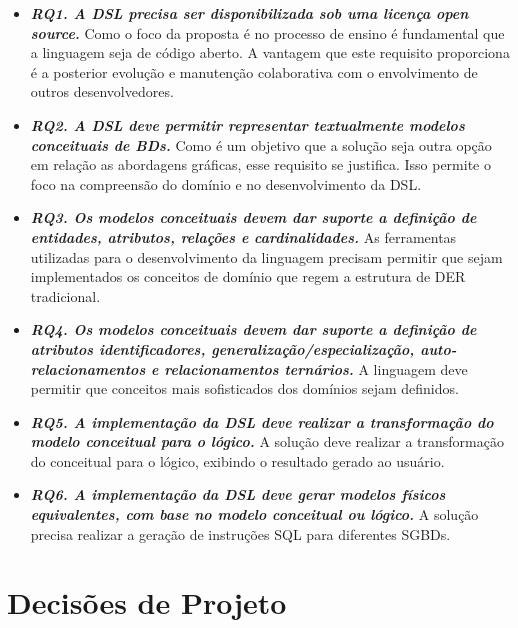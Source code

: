 \begin{itemize}

\item\textit{\textbf{RQ1. A \ac{DSL} precisa ser disponibilizada sob uma licença open source.}} 
Como o foco da proposta é no processo de ensino é fundamental que a linguagem seja de código aberto. 
A vantagem que este requisito proporciona é a posterior evolução e manutenção colaborativa com o envolvimento de outros desenvolvedores.

\item\textit{\textbf{RQ2. A \ac{DSL} deve permitir representar textualmente modelos conceituais de \acp{BD}.}} 
Como é um objetivo que a solução seja outra opção em relação as abordagens gráficas, esse requisito se justifica. 
Isso permite o foco na compreensão do domínio e no desenvolvimento da \ac{DSL}.

\item\textit{\textbf{RQ3. Os modelos conceituais devem dar suporte a definição de entidades, atributos, relações e cardinalidades.}} 
As ferramentas utilizadas para o desenvolvimento da linguagem precisam permitir que sejam implementados os conceitos de domínio que regem a estrutura de \ac{DER} tradicional.

\item\textit{\textbf{RQ4. Os modelos conceituais devem dar suporte a definição de atributos identificadores, generalização/especialização, auto-relacionamentos e relacionamentos ternários.}} 
A linguagem deve permitir que conceitos mais sofisticados dos domínios sejam definidos.

\item\textit{\textbf{RQ5. A implementação da \ac{DSL} deve realizar a transformação do modelo conceitual para o lógico.}} 
A solução deve realizar a transformação do conceitual para o lógico, exibindo o resultado gerado ao usuário.

\item\textit{\textbf{RQ6. A implementação da \ac{DSL} deve gerar modelos físicos equivalentes, com base no modelo conceitual ou lógico.}} 
A solução precisa realizar a geração de instruções \ac{SQL} para diferentes \acp{SGBD}.

\end{itemize}

\section{Decisões de Projeto} \label{sec:decDSL}

